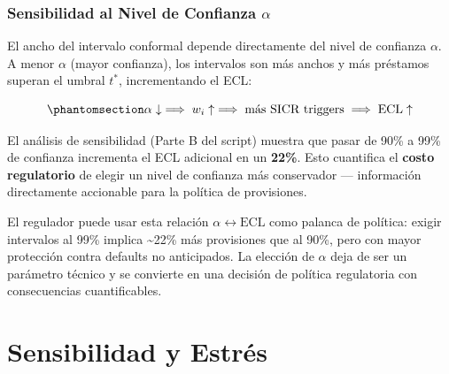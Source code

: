 \documentclass[
  spanish,
  11pt,
  letterpaper,
]{scrbook}
\theoremstyle{plain}
\theoremstyle{remark}
\begin{document}
\subsection{\texorpdfstring{Sensibilidad al Nivel de Confianza
\(\alpha\)}{Sensibilidad al Nivel de Confianza \textbackslash alpha}}\label{sensibilidad-al-nivel-de-confianza-alpha}

El ancho del intervalo conformal depende directamente del nivel de
confianza \(\alpha\). A menor \(\alpha\) (mayor confianza), los
intervalos son más anchos y más préstamos superan el umbral \(t^*\),
incrementando el ECL:

\begin{equation}\protect\phantomsection\label{eq-alpha-ecl}{
\alpha \downarrow \implies w_i \uparrow \implies \text{más SICR triggers} \implies \text{ECL} \uparrow
}\end{equation}

El análisis de sensibilidad (Parte B del script) muestra que pasar de
90\% a 99\% de confianza incrementa el ECL adicional en un
\textbf{22\%}. Esto cuantifica el \textbf{costo regulatorio} de elegir
un nivel de confianza más conservador --- información directamente
accionable para la política de provisiones.

\begin{tcolorbox}[enhanced jigsaw, arc=.35mm, bottomrule=.15mm, bottomtitle=1mm, breakable, colback=white, colbacktitle=quarto-callout-tip-color!10!white, colframe=quarto-callout-tip-color-frame, coltitle=black, left=2mm, leftrule=.75mm, opacityback=0, opacitybacktitle=0.6, rightrule=.15mm, title=\textcolor{quarto-callout-tip-color}{\faLightbulb}\hspace{0.5em}{Implicación Regulatoria}, titlerule=0mm, toprule=.15mm, toptitle=1mm]

El regulador puede usar esta relación
\(\alpha \leftrightarrow \text{ECL}\) como palanca de política: exigir
intervalos al 99\% implica \textasciitilde22\% más provisiones que al
90\%, pero con mayor protección contra defaults no anticipados. La
elección de \(\alpha\) deja de ser un parámetro técnico y se convierte
en una decisión de política regulatoria con consecuencias
cuantificables.

\end{tcolorbox}

\chapter{Sensibilidad y Estrés}\label{sec-sensitivity-stress}
\end{document}
